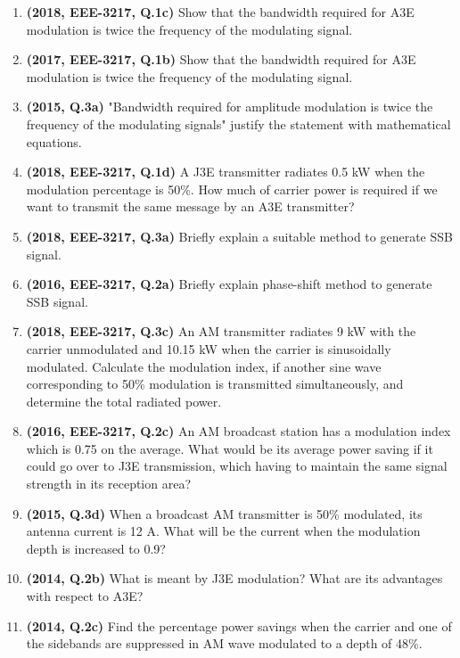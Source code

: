 \documentclass[12pt, a4paper]{article}
\begin{document}
\begin{enumerate}
		\item \textbf{(2018, EEE-3217, Q.1c)} Show that the bandwidth required for A3E modulation is twice the frequency of the modulating signal.
		\item \textbf{(2017, EEE-3217, Q.1b)} Show that the bandwidth required for A3E modulation is twice the frequency of the modulating signal.
		\item \textbf{(2015, Q.3a)} "Bandwidth required for amplitude modulation is twice the frequency of the modulating signals" justify the statement with mathematical equations.
		
		\item \textbf{(2018, EEE-3217, Q.1d)} A J3E transmitter radiates 0.5 kW when the modulation percentage is 50\%. How much of carrier power is required if we want to transmit the same message by an A3E transmitter?
		
		\item \textbf{(2018, EEE-3217, Q.3a)} Briefly explain a suitable method to generate SSB signal.
		\item \textbf{(2016, EEE-3217, Q.2a)} Briefly explain phase-shift method to generate SSB signal.
		
		\item \textbf{(2018, EEE-3217, Q.3c)} An AM transmitter radiates 9 kW with the carrier unmodulated and 10.15 kW when the carrier is sinusoidally modulated. Calculate the modulation index, if another sine wave corresponding to 50\% modulation is transmitted simultaneously, and determine the total radiated power.
		
		\item \textbf{(2016, EEE-3217, Q.2c)} An AM broadcast station has a modulation index which is 0.75 on the average. What would be its average power saving if it could go over to J3E transmission, which having to maintain the same signal strength in its reception area?
		
		\item \textbf{(2015, Q.3d)} When a broadcast AM transmitter is 50\% modulated, its antenna current is 12 A. What will be the current when the modulation depth is increased to 0.9?
		
		\item \textbf{(2014, Q.2b)} What is meant by J3E modulation? What are its advantages with respect to A3E?
		\item \textbf{(2014, Q.2c)} Find the percentage power savings when the carrier and one of the sidebands are suppressed in AM wave modulated to a depth of 48\%.
		

\end{enumerate}
\end{document}
